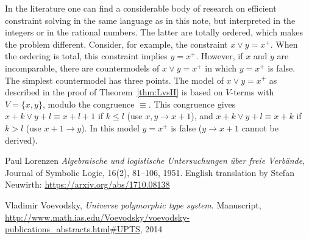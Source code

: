 \documentclass[11pt,a4paper]{article}
\newcommand\set[1]{\{#1\}}
\begin{document}
In the literature one can find a considerable body of research 
on efficient constraint solving in the same language as in this note,
but interpreted in the integers or in the rational numbers.
The latter are totally ordered, which makes the problem different.
Consider, for example, the constraint $x\vee y = x^+$.
When the ordering is total, this constraint implies $y = x^+$.
However, if $x$ and $y$ are incomparable, there are countermodels
of $x\vee y = x^+$ in which $y = x^+$ is false. The simplest
countermodel has three points. The model of $x\vee y = x^+$
as described in the proof of Theorem~\ref{thm:LvsH} is based
on $V$-terms with $V=\set{x,y}$, modulo the congruence $\equiv$.
This congruence gives ${x+k \vee y+l} \equiv {x+l+1}$ if $k\leq l$
(use $x,y \to x+1$),
and ${x+k \vee y+l} \equiv {x+k}$ if $k>l$
(use $x+1\to y$).
In this model $y = x^+$ is false ($y\to x+1$ cannot be derived).




\begin{thebibliography}{99}

Paul Lorenzen
  \newblock\emph{Algebraische und logistische Untersuchungen über freie Verbände},
Journal of Symbolic Logic, 16(2), 81--106, 1951.
English translation by Stefan Neuwirth: \url{https://arxiv.org/abs/1710.08138}

  Vladimir Voevodsky,
 \newblock\emph{Universe polymorphic type system}.
Manuscript, \url{http://www.math.ias.edu/Voevodsky/voevodsky-publications_abstracts.html\#UPTS},
  {2014}
\end{thebibliography}
\end{document}
